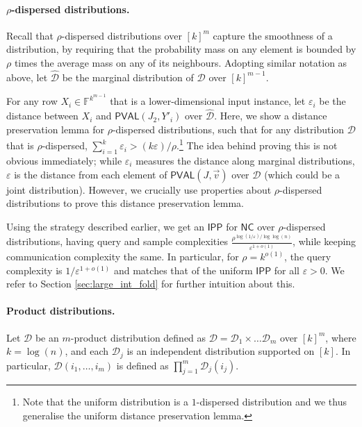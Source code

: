 \documentclass[11pt]{article}
\newcommand{\NC}{\mathsf{NC}}
\newcommand{\PVAL}{\mathsf{PVAL}}
\newcommand{\IPP}{\mathsf{IPP}}
\newcommand{\F}{\mathbb{F}}
\newcommand{\sD}{\mathcal{D}}
\newcommand{\eps}{\varepsilon}
\begin{document}
\paragraph{$\rho$-dispersed distributions.} Recall that $\rho$-dispersed distributions over $[k]^m$ capture the smoothness of a distribution, by 
requiring that the probability mass on any element is bounded by $\rho$ times the average mass on any of its neighbours. Adopting similar notation as above, let $\hat{\sD}$ be the marginal distribution of $\sD$ over $[k]^{m-1}$.

For any row $X_i \in \F^{k^{m-1}}$ that is a lower-dimensional input instance, let $\varepsilon_i$ be the distance between $X_i$ and $\PVAL(J_2, Y'_i)$ over $\hat{\sD}$. Here, we show a distance preservation lemma for $\rho$-dispersed distributions, such that for any distribution $\sD$ that is $\rho$-dispersed, $\sum_{i=1}^k \varepsilon_i > (k\varepsilon)/\rho$.\footnote{Note that the uniform distribution is a $1$-dispersed distribution and we thus generalise the uniform distance preservation lemma.} The idea behind proving this is not obvious immediately; while $\varepsilon_i$ measures the distance along marginal distributions, $\eps$ is the distance from each element of $\PVAL(J,\vec{v})$ over $\sD$ (which could be a joint distribution). However, we crucially use properties about $\rho$-dispersed distributions to prove this distance preservation lemma. 

Using the strategy described earlier, we get an $\IPP$ for $\NC$ over $\rho$-dispersed distributions, having query and sample complexities $\frac{\rho^{\log (1/\varepsilon)/\log\log (n)}}{\varepsilon ^{1+o(1)}}$, while keeping communication complexity the same. In particular, for $\rho = k^{o(1)}$, the query complexity is $1/\varepsilon^{1+o(1)}$ and matches that of the uniform $\IPP$ for all $\varepsilon > 0$. We refer to Section \ref{sec:large_int_fold} for further intuition about this.

\paragraph*{Product distributions.} Let $\sD$ be an $m$-product distribution defined as $\sD = \sD_1 \times \dots \sD_m$ over $[k]^m$, where $k = \log(n)$, and each $\sD_j$ is an independent distribution supported on $[k]$. In particular, $\sD(i_1, \dots, i_m)$ is defined as $\prod_{j=1}^m \sD_j(i_j)$. 
\end{document}

